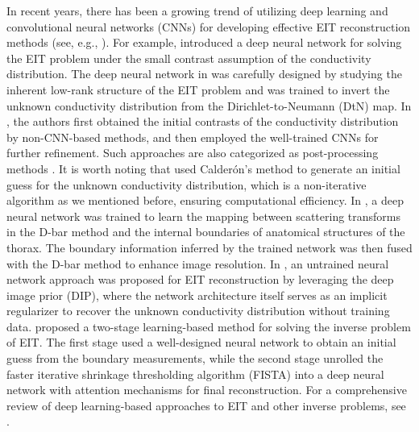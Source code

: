 \documentclass[11pt]{article}
\newcommand{\Calderon}{Calder\'{o}n}
\begin{document}
In recent years, there has been a growing trend of utilizing deep learning and convolutional neural networks (CNNs) for developing effective EIT reconstruction methods (see, e.g., \cite{HSJ18, FYY20, WZL19, GRJ21, CSJ23, SBZ23, LDW23, ZBZ25}).
For example, \cite{FYY20} introduced a deep neural network for solving the EIT problem under the small contrast assumption of the conductivity distribution. 
The deep neural network in \cite{FYY20} was carefully designed by studying the inherent low-rank structure of the EIT problem and was trained to invert the unknown conductivity distribution from the Dirichlet-to-Neumann (DtN) map.
In \cite{HSJ18, WZL19, GRJ21, CSJ23, SBZ23}, the authors first obtained the initial contrasts of the conductivity distribution by non-CNN-based methods, and then employed the well-trained CNNs for further refinement.
Such approaches are also categorized as post-processing methods \cite{ASM19}.
It is worth noting that \cite{CSJ23, SBZ23} used \Calderon's method to generate an initial guess for the unknown conductivity distribution, which is a non-iterative algorithm as we mentioned before, ensuring computational efficiency. 
In \cite{CMM21}, a deep neural network was trained to learn the mapping between scattering transforms in the D-bar method and the internal boundaries of anatomical structures of the thorax. 
The boundary information inferred by the trained network was then fused with the D-bar method to enhance image resolution.
In \cite{LDW23}, an untrained neural network approach was proposed for EIT reconstruction by leveraging the deep image prior (DIP), where the network architecture itself serves as an implicit regularizer to recover the unknown conductivity distribution without training data.
\cite{ZBZ25} proposed a two-stage learning-based method for solving the inverse problem of EIT.
The first stage used a well-designed neural network to obtain an initial guess from the boundary measurements, while the second stage unrolled the faster iterative shrinkage thresholding algorithm (FISTA) into a deep neural network with attention mechanisms for final reconstruction. For a comprehensive review of deep learning-based approaches to EIT and other inverse problems, see \cite{TDN23, ASM19, HMN23, LS22}.
\end{document}
